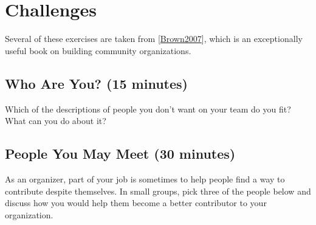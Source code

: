 \documentclass[10pt,statementpaper]{memoir}
\begin{document}
\section{Challenges}\label{challenges-10}

Several of these exercises are taken from
{[}\href{biblio.html\#brown-bpco}{Brown2007}{]}, which is an
exceptionally useful book on building community organizations.

\subsection*{Who Are You? (15 minutes)}\label{who-are-you-15-minutes}

Which of the descriptions of people you don't want on your team do you
fit? What can you do about it?

\subsection*{People You May Meet (30
minutes)}\label{people-you-may-meet-30-minutes}

As an organizer, part of your job is sometimes to help people find a way
to contribute despite themselves. In small groups, pick three of the
people below and discuss how you would help them become a better
contributor to your organization.
\end{document}
